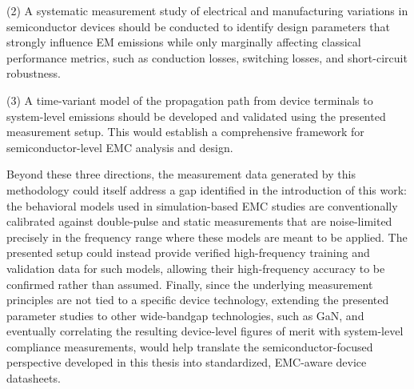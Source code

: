 (2) A systematic measurement study of electrical and manufacturing variations in semiconductor devices should be conducted to identify design parameters that strongly influence EM emissions while only marginally affecting classical performance metrics, such as conduction losses, switching losses, and short-circuit robustness.

(3) A time-variant model of the propagation path from device terminals to system-level emissions should be developed and validated using the presented measurement setup.
This would establish a comprehensive framework for semiconductor-level EMC analysis and design.

Beyond these three directions, the measurement data generated by this methodology could itself address a gap identified in the introduction of this work: the behavioral models used in simulation-based EMC studies are conventionally calibrated against double-pulse and static measurements that are noise-limited precisely in the frequency range where these models are meant to be applied.
The presented setup could instead provide verified high-frequency training and validation data for such models, allowing their high-frequency accuracy to be confirmed rather than assumed.
Finally, since the underlying measurement principles are not tied to a specific device technology, extending the presented parameter studies to other wide-bandgap technologies, such as GaN, and eventually correlating the resulting device-level figures of merit with system-level compliance measurements, would help translate the semiconductor-focused perspective developed in this thesis into standardized, EMC-aware device datasheets.